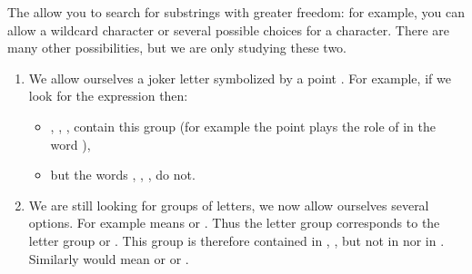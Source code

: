 \documentclass[11pt,class=report,crop=false]{standalone}
\begin{document}
\begin{cours}


The  allow you to search for substrings with greater freedom: for example, you can allow a wildcard character or several possible choices for a character.
There are many other possibilities, but we are only studying these two.

\begin{enumerate}
  \item We allow ourselves a joker letter symbolized by a point \og{}\fg{}. For example, if we look for the expression \og{}\fg{} then:

\begin{itemize}
  \item {}, , ,  contain this group (for example the point plays the role of  in the word ),
  \item but the words , , ,  do not. 
\end{itemize}

  \item We are still looking for groups of letters, we now allow ourselves several options. For example \og\mot{[CT]}\fg{} means \og{} or \fg{}. Thus the letter group \og{}\fg{} corresponds to the letter group \og{}\fg{} or \og{}\fg{}. This group is therefore contained in , ,  but not in  nor in . Similarly \og\mot{[ABC]}\fg{} would mean \og{} or  or \fg{}.

\end{enumerate}

 

\bigskip


\end{cours}
\end{document}
